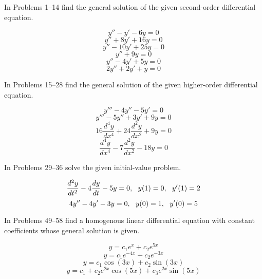 \documentclass[12pt]{report}
\begin{document}

In Problems 1--14 find the general solution of the given second-order differential equation.
\begin{enumerate}[label=\arabic*.,start=3]
	 \[ y'' - y' - 6y = 0 \]				%
	\setcounter{enumi}{4}
	 \[ y'' + 8y' + 16y = 0 \]				%
	 \[ y'' - 10y' + 25y = 0 \]			%
	\setcounter{enumi}{8}
	 \[ y'' + 9y = 0 \] 					%
	\setcounter{enumi}{10}
	 \[ y'' - 4y' + 5y = 0 \] 				%
	 \[ 2y'' + 2y' + y = 0 \] 				%
\end{enumerate}

In Problems 15--28 find the general solution of the given higher-order differential equation.
\begin{enumerate}[label=\arabic*.,start=15]
	 \[ y''' - 4y'' - 5y' = 0 \]										%
	\setcounter{enumi}{16}
	 \[ y''' - 5y'' + 3y' + 9y = 0 \]									%
	\setcounter{enumi}{24}
	 \[ 16\frac{d^{4}y}{dx^{4}} + 24\frac{d^{2}y}{dx^{2}} + 9y = 0 \]	%
	 \[ \frac{d^{4}y}{dx^{4}} - 7\frac{d^{2}y}{dx^{2}} - 18y = 0 \]	%
\end{enumerate}

In Problems 29--36 solve the given initial-value problem.
\begin{enumerate}[label=\arabic*.,start=31]
	 \[ \frac{d^{2}y}{dt^{2}} - 4\frac{dy}{dt} - 5y = 0,\mbox{{ }{ }} y(1)=0,\mbox{{ }{ }} y'(1)=2 \]			%
	 \[ 4y'' - 4y' - 3y = 0,\mbox{{ }{ }} y(0)=1,\mbox{{ }{ }} y'(0)=5 \]										%
\end{enumerate}

In Problems 49--58 find a homogenous linear differential equation with constant coefficients whose general solution is given.
\begin{enumerate}[label=\arabic*.,start=49]
	 \[ y = c_{1}e^{x} + c_{2}e^{5x} \]							%
	 \[ y = c_{1}e^{-4x} + c_{2}e^{-3x} \]							%
	\setcounter{enumi}{52}
	 \[ y = c_{1}\cos(3x) + c_{2}\sin(3x) \]						%
	\setcounter{enumi}{55}
	 \[ y = c_{1} + c_{2}e^{2x}\cos(5x) + c_{3}e^{2x}\sin(5x) \]	%
\end{enumerate}
\end{document}
